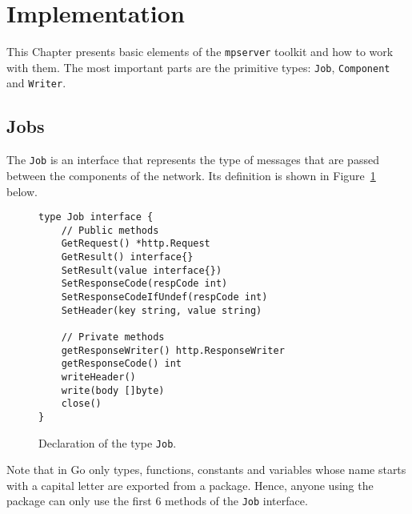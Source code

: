 \section{Implementation}
\label{sec:impl}
This Chapter presents basic elements of the \texttt{mpserver} toolkit
and how to work with them. The most important parts are the primitive types:
\texttt{Job}, \texttt{Component} and \texttt{Writer}.

\subsection{Jobs}
The \texttt{Job} is an interface that represents the type of messages that are
passed between the components of the network. Its definition is shown
in Figure~\ref{fig:Job} below.

\begin{figure}[h]
\centering
\begin{lstlisting}
type Job interface {
    // Public methods
    GetRequest() *http.Request
    GetResult() interface{}
    SetResult(value interface{})
    SetResponseCode(respCode int)
    SetResponseCodeIfUndef(respCode int)
    SetHeader(key string, value string)

    // Private methods
    getResponseWriter() http.ResponseWriter
    getResponseCode() int
    writeHeader()
    write(body []byte)
    close()
}
\end{lstlisting}
\caption[scale=1.0]{Declaration of the type \texttt{Job}.}
\label{fig:Job}
\end{figure}

Note that in Go only types, functions, constants and variables whose name
starts with a capital letter are exported from a package. Hence, anyone
using the package can only use the first 6 methods of the \texttt{Job}
interface.

